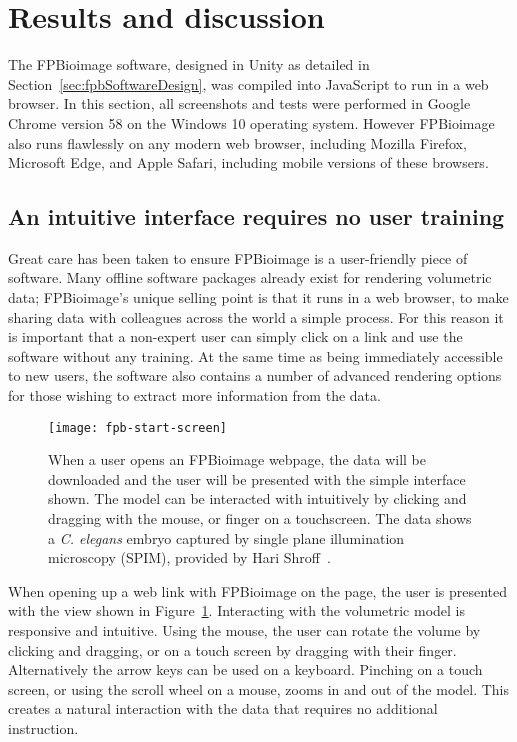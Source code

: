 \section{Results and discussion} \label{sec:fpbResults}
The FPBioimage software, designed in Unity as detailed in Section~\ref{sec:fpbSoftwareDesign}, was compiled into JavaScript to run in a web browser.
In this section, all screenshots and tests were performed in Google Chrome version 58 on the Windows 10 operating system.
However FPBioimage also runs flawlessly on any modern web browser, including Mozilla Firefox, Microsoft Edge, and Apple Safari, including mobile versions of these browsers.

\subsection{An intuitive interface requires no user training}
Great care has been taken to ensure FPBioimage is a user-friendly piece of software.
Many offline software packages already exist for rendering volumetric data; FPBioimage's unique selling point is that it runs in a web browser, to make sharing data with colleagues across the world a simple process.
For this reason it is important that a non-expert user can simply click on a link and use the software without any training.
At the same time as being immediately accessible to new users, the software also contains a number of advanced rendering options for those wishing to extract more information from the data.

\begin{figure}[htbp!]
\centering
\texttt{[image: fpb-start-screen]}
\caption[FPBioimage: Users are presented with a simple interface which is intuitive to use]{When a user opens an FPBioimage webpage, the data will be downloaded and the user will be presented with the simple interface shown. The model can be interacted with intuitively by clicking and dragging with the mouse, or finger on a touchscreen. The data shows a \textit{C. elegans} embryo captured by single plane illumination microscopy (SPIM), provided by Hari Shroff~\cite{kumar2014dual}. }
\label{fig:FPBhome}
\end{figure}

When opening up a web link with FPBioimage on the page, the user is presented with the view shown in Figure~\ref{fig:FPBhome}.
Interacting with the volumetric model is responsive and intuitive.
Using the mouse, the user can rotate the volume by clicking and dragging, or on a touch screen by dragging with their finger.
Alternatively the arrow keys can be used on a keyboard.
Pinching on a touch screen, or using the scroll wheel on a mouse, zooms in and out of the model.
This creates a natural interaction with the data that requires no additional instruction.

